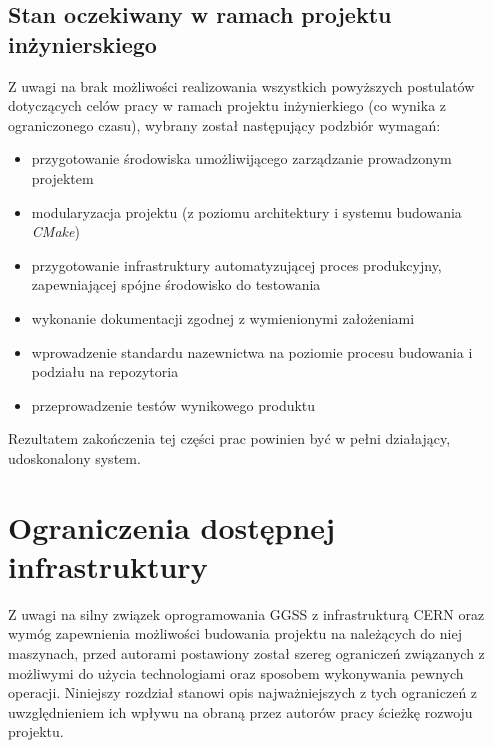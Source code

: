 \section{Stan oczekiwany w ramach projektu inżynierskiego}
Z uwagi na brak możliwości realizowania wszystkich powyższych postulatów dotyczących celów pracy w ramach projektu inżynierkiego (co wynika z ograniczonego czasu), wybrany został następujący podzbiór wymagań:
\begin{itemize}
\item przygotowanie środowiska umożliwijącego zarządzanie prowadzonym projektem
\item modularyzacja projektu (z poziomu architektury i systemu budowania \textit{CMake})
\item przygotowanie infrastruktury automatyzującej proces produkcyjny, zapewniającej spójne środowisko do testowania
\item wykonanie dokumentacji zgodnej z wymienionymi założeniami
\item wprowadzenie standardu nazewnictwa na poziomie procesu budowania i podziału na repozytoria
\item przeprowadzenie testów wynikowego produktu
\end{itemize}
Rezultatem zakończenia tej części prac powinien być w pełni działający, udoskonalony system.



\chapter{Ograniczenia dostępnej infrastruktury}
\label{cha:ogra}
Z uwagi na silny związek oprogramowania GGSS z infrastrukturą CERN oraz wymóg zapewnienia możliwości budowania projektu na należących do niej maszynach, przed autorami postawiony został szereg ograniczeń związanych z możliwymi do użycia technologiami oraz sposobem wykonywania pewnych operacji. Niniejszy rozdział stanowi opis najważniejszych z tych ograniczeń z uwzględnieniem ich wpływu na obraną przez autorów pracy ścieżkę rozwoju projektu.


